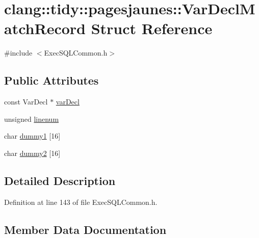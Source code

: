 \hypertarget{structclang_1_1tidy_1_1pagesjaunes_1_1_var_decl_match_record}{}\section{clang\+:\+:tidy\+:\+:pagesjaunes\+:\+:Var\+Decl\+Match\+Record Struct Reference}
\label{structclang_1_1tidy_1_1pagesjaunes_1_1_var_decl_match_record}


{\ttfamily \#include $<$Exec\+S\+Q\+L\+Common.\+h$>$}

\subsection*{Public Attributes}
\begin{DoxyCompactItemize}
\item 
const Var\+Decl $\ast$ \hyperlink{structclang_1_1tidy_1_1pagesjaunes_1_1_var_decl_match_record_ade181f34be72c3c2c3d5a8bfe292ad5c}{var\+Decl}
\item 
unsigned \hyperlink{structclang_1_1tidy_1_1pagesjaunes_1_1_var_decl_match_record_a8b83642ccb239d58def5c5d672538046}{linenum}
\item 
char \hyperlink{structclang_1_1tidy_1_1pagesjaunes_1_1_var_decl_match_record_af11000ff416a5018e58fe64e99212093}{dummy1} \mbox{[}16\mbox{]}
\item 
char \hyperlink{structclang_1_1tidy_1_1pagesjaunes_1_1_var_decl_match_record_a0c289570c70d1f28afe28f7e712f4255}{dummy2} \mbox{[}16\mbox{]}
\end{DoxyCompactItemize}


\subsection{Detailed Description}


Definition at line 143 of file Exec\+S\+Q\+L\+Common.\+h.



\subsection{Member Data Documentation}
\mbox{\label{structclang_1_1tidy_1_1pagesjaunes_1_1_var_decl_match_record_af11000ff416a5018e58fe64e99212093}} 
